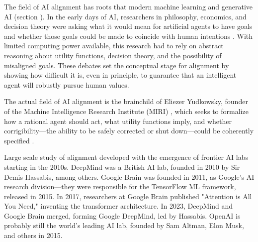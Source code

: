 

The field of AI alignment has roots that modern machine learning and generative AI (section ). In the early days of AI, researchers in philosophy, economics, and decision theory were asking what it would mean for artificial agents to have goals and whether those goals could be made to coincide with human intentions \cite{von1944games,omohundro2008drives,bostrom2014superintelligence}. With limited computing power available, this research had to rely on abstract reasoning about utility functions, decision theory, and the possibility of misaligned goals.  These debates set the conceptual stage for alignment by showing how difficult it is, even in principle, to guarantee that an intelligent agent will robustly pursue human values.

The actual field of AI alignment is the brainchild of Eliezer Yudkowsky, founder of the Machine Intelligence Research Institute (MIRI)
\cite{yudkowsky2008factor}, which seeks to formalize how a rational agent should act, what utility functions imply, and whether corrigibility---the ability to be safely corrected or shut down---could be coherently specified \cite{soares2015corrigibility}. 

Large scale study of alignment developed with the emergence of frontier AI labs starting in the 2010s. DeepMind was a British AI lab, founded in 2010 by Sir Demis Hassabis, among others. Google Brain was founded in 2011, as Google's AI research division—they were responsible for the TensorFlow ML framework, released in 2015. In 2017, researchers at Google Brain published "Attention is All You Need," inventing the transformer architecture. In 2023, DeepMind and Google Brain merged, forming Google DeepMind, led by Hassabis. OpenAI is probably still the world's leading AI lab, founded by Sam Altman, Elon Musk, and others in 2015. 

